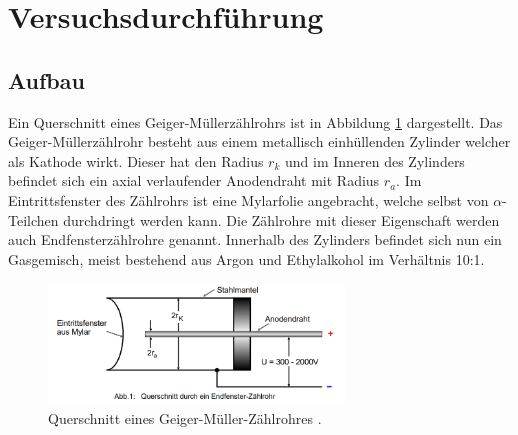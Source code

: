 \section{Versuchsdurchführung}
\subsection{Aufbau}
Ein Querschnitt eines Geiger-Müllerzählrohrs ist in Abbildung \ref{fig:geigermuellerpic} dargestellt.
Das Geiger-Müllerzählrohr besteht aus einem metallisch einhüllenden Zylinder welcher als Kathode wirkt. 
Dieser hat den Radius $r_{k}$ und im Inneren des Zylinders befindet sich ein axial verlaufender Anodendraht mit Radius $r_{a}$.
Im Eintrittsfenster des Zählrohrs ist eine Mylarfolie angebracht, welche selbst von $\alpha$-Teilchen durchdringt werden kann. Die Zählrohre mit dieser Eigenschaft
werden auch Endfensterzählrohre genannt.
Innerhalb des Zylinders befindet sich nun ein Gasgemisch, meist bestehend aus Argon und Ethylalkohol im Verhältnis 10:1.
\begin{figure}
  \centering
  \includegraphics[width=0.7\textwidth]{bilder/Abbildung.png}
  \caption{Querschnitt eines Geiger-Müller-Zählrohres \cite{ap03}.}
  \label{fig:geigermuellerpic}
\end{figure}

